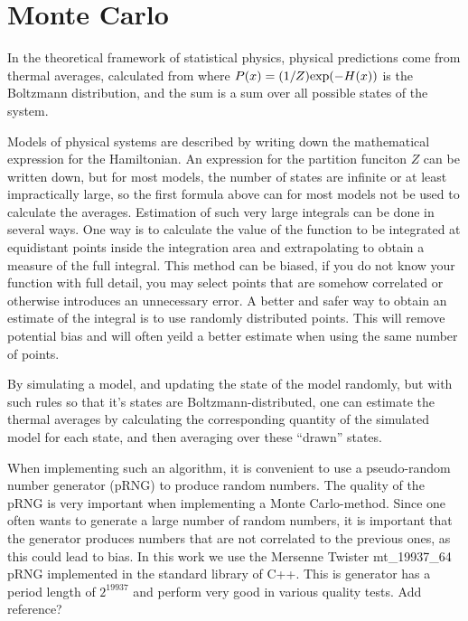 %

\section{Monte Carlo}
In the theoretical framework of statistical physics, physical predictions come from thermal averages, calculated from 
where  $P(x) = (1/Z)\textrm{exp}(-H(x))$ is the Boltzmann distribution, and the sum is a sum over all possible states of the system. 

Models of physical systems are described by writing down the mathematical expression for the Hamiltonian.
An expression for the partition funciton $Z$ can be written down, but for most models, the number of states are infinite or at least impractically large, so the first formula above can for most models not be used to calculate the averages.
Estimation of such very large integrals can be done in several ways.
One way is to calculate the value of the function to be integrated at equidistant points inside the integration area and extrapolating to obtain a measure of the full integral.
This method can be biased, if you do not know your function with full detail, you may select points that are somehow correlated or otherwise introduces an unnecessary error.
A better and safer way to obtain an estimate of the integral is to use randomly distributed points.
This will remove potential bias and will often yeild a better estimate when using the same number of points.

By simulating a model, and updating the state of the model randomly, but with such rules so that it's states are Boltzmann-distributed, one can estimate the thermal averages by calculating the corresponding quantity of the simulated model for each state, and then averaging over these ``drawn'' states. 



When implementing such an algorithm, it is convenient to use a pseudo-random number generator (pRNG) to produce random numbers.
The quality of the pRNG is very important when implementing a Monte Carlo-method.
Since one often wants to generate a large number of random numbers, it is important that the generator produces numbers that are not correlated to the previous ones, as this could lead to bias. 
In this work we use the Mersenne Twister mt\_19937\_64  pRNG implemented in the standard library of C++.
This is generator has a period length of $2^{19937}$ and perform very good in various quality tests. Add reference?



